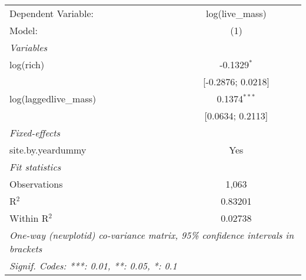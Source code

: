 \begin{tabular}{lc}
\tabularnewline\midrule\midrule
Dependent Variable:&log(live\_mass)\\
Model:&(1)\\
\midrule \emph{Variables}&  \\
log(rich)&-0.1329$^{*}$\\
  &[-0.2876; 0.0218]\\
log(laggedlive\_mass)&0.1374$^{***}$\\
  &[0.0634; 0.2113]\\
\midrule \emph{Fixed-effects}&  \\
site.by.yeardummy & Yes\\
\midrule \emph{Fit statistics}&  \\
Observations & 1,063\\
R$^2$ & 0.83201\\
Within R$^2$ & 0.02738\\
\midrule\midrule\multicolumn{2}{l}{\emph{One-way (newplotid) co-variance matrix, 95\% confidence intervals in brackets}}\\
\multicolumn{2}{l}{\emph{Signif. Codes: ***: 0.01, **: 0.05, *: 0.1}}\\
\end{tabular}


